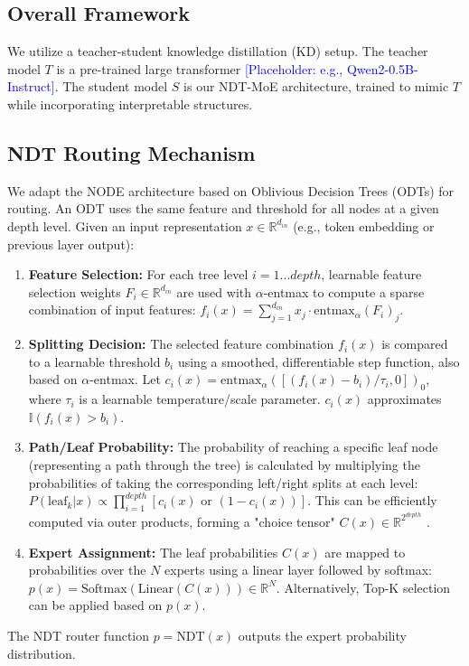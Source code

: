 \documentclass[11pt,a4paper]{article}
\newcommand{\placeholder}[1]{\textcolor{blue}{[Placeholder: #1]}}
\begin{document}
\subsection{Overall Framework}
We utilize a teacher-student knowledge distillation (KD) setup. The teacher model $T$ is a pre-trained large transformer \placeholder{e.g., Qwen2-0.5B-Instruct}. The student model $S$ is our NDT-MoE architecture, trained to mimic $T$ while incorporating interpretable structures.

\subsection{NDT Routing Mechanism}
We adapt the NODE \citep{popov2019neural} architecture based on Oblivious Decision Trees (ODTs) for routing. An ODT uses the same feature and threshold for all nodes at a given depth level.
Given an input representation $x \in \mathbb{R}^{d_{in}}$ (e.g., token embedding or previous layer output):
\begin{enumerate}
    \item \textbf{Feature Selection:} For each tree level $i=1...depth$, learnable feature selection weights $F_i \in \mathbb{R}^{d_{in}}$ are used with $\alpha$-entmax \citep{peters2019sparse} to compute a sparse combination of input features: $f_i(x) = \sum_{j=1}^{d_{in}} x_j \cdot \text{entmax}_{\alpha}(F_i)_j$.
    \item \textbf{Splitting Decision:} The selected feature combination $f_i(x)$ is compared to a learnable threshold $b_i$ using a smoothed, differentiable step function, also based on $\alpha$-entmax. Let $c_i(x) = \text{entmax}_{\alpha}( [(f_i(x) - b_i)/\tau_i, 0] )_0$, where $\tau_i$ is a learnable temperature/scale parameter. $c_i(x)$ approximates $\mathbb{I}(f_i(x) > b_i)$.
    \item \textbf{Path/Leaf Probability:} The probability of reaching a specific leaf node (representing a path through the tree) is calculated by multiplying the probabilities of taking the corresponding left/right splits at each level: $P(\text{leaf}_k | x) \propto \prod_{i=1}^{depth} [c_i(x) \text{ or } (1-c_i(x))]$. This can be efficiently computed via outer products, forming a "choice tensor" $C(x) \in \mathbb{R}^{2^{depth}}$ \citep{popov2019neural}.
    \item \textbf{Expert Assignment:} The leaf probabilities $C(x)$ are mapped to probabilities over the $N$ experts using a linear layer followed by softmax: $p(x) = \text{Softmax}(\text{Linear}(C(x))) \in \mathbb{R}^N$. Alternatively, Top-K selection can be applied based on $p(x)$.
\end{enumerate}
The NDT router function $p = \text{NDT}(x)$ outputs the expert probability distribution.
\end{document}
